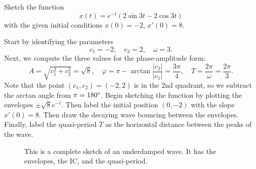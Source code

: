 \documentclass[10pt,letterpaper]{article}
\begin{document}
\begin{example}[5]
{

Sketch the function 
$$
x(t) = e^{-t}(2\sin 3t -2 \cos 3t)
$$
with the given initial conditions $x(0)=-2$, $x'(0)=8$. 
}
Start by identifying the parameters 
$$
    c_1=-2,\quad c_2=2,\quad \omega=3.
$$
Next, we compute the three values for the phase-amplitude form:
$$
A=\sqrt{c^2_1+c^2_2} = \sqrt{8},\quad \varphi =\pi - \arctan\frac{|c_2|}{|c_1|}=\frac{3\pi}{4},\quad T=\frac{2\pi}{\omega}=\frac{2\pi}{3}.
$$
Note that the point $(c_1,c_2)=(-2,2)$ is in the 2nd quadrant, so we subtract the arctan angle from $\pi=180\degree$. Begin sketching the function by plotting the envelopes $ \pm\sqrt{8}e^{-t}$. Then label the initial position $(0,-2)$ with the slope $x'(0)=8$. Then draw the decaying wave bouncing between the envelopes. Finally, label the quasi-period $T$ as the horizontal distance between the peaks of the wave. 

\begin{figure}[H]
\centering
{}
\caption{This is a complete sketch of an underdamped wave. It has the envelopes, the IC, and the quasi-period.}
\end{figure}
\end{example}
\end{document}
